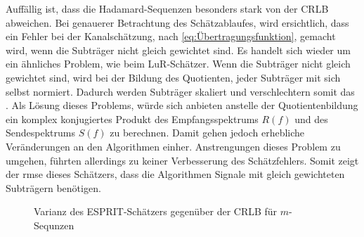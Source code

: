 Auffällig ist, dass die Hadamard-Sequenzen besonders stark von der \gls{CRLB} abweichen.
Bei genauerer Betrachtung des Schätzablaufes, wird ersichtlich, dass ein Fehler bei der Kanalschätzung, nach \eqref{eq:Übertragungsfunktion}, gemacht wird, wenn die Subträger nicht gleich gewichtet sind. Es handelt sich wieder um ein ähnliches Problem, wie beim \gls{LuR}-Schätzer. Wenn die Subträger nicht gleich gewichtet sind, wird bei der Bildung des Quotienten, jeder Subträger mit sich selbst normiert. Dadurch werden Subträger skaliert und verschlechtern somit das . Als Lösung dieses Problems, würde sich anbieten anstelle der Quotientenbildung ein komplex konjugiertes Produkt des Empfangsspektrums $R(f)$ und des Sendespektrums $S(f)$ zu berechnen. Damit gehen jedoch erhebliche Veränderungen an den Algorithmen einher.  Anstrengungen dieses Problem zu umgehen, führten allerdings zu keiner Verbesserung des Schätzfehlers. Somit zeigt der \gls{rmse} dieses Schätzers, dass die Algorithmen Signale mit gleich gewichteten Subträgern benötigen. 

\begin{figure}[htbp]
	\centering
	\caption{Varianz des \gls{ESPRIT}-Schätzers gegenüber der CRLB für $m$-Sequnzen}
	\label{fig:m_ESPRIT_CRLB_vergleich}
\end{figure}

